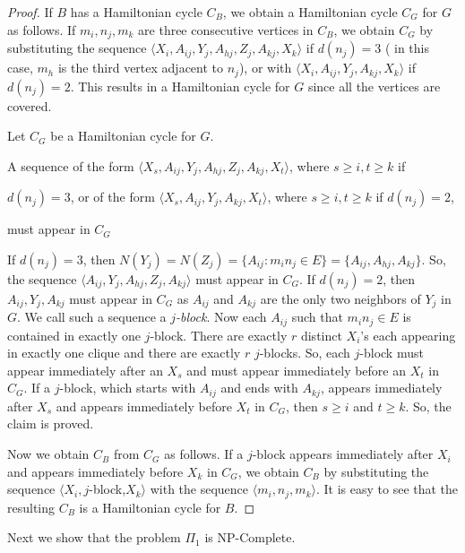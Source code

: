 \documentclass[a4paper,12pt]{article}
\theoremstyle{plain}
\theoremstyle{definition}
\theoremstyle{remark}
\begin{document}
\begin{proof}

If $B$ has a Hamiltonian cycle $C_B$, we obtain a Hamiltonian cycle
$C_G$ for $G$ as follows. If $m_i, n_j, m_k$ are three consecutive
vertices in $C_B$, we obtain $C_G$ by substituting the sequence
$\langle X_i, A_{ij}, Y_j, A_{hj}, Z_j, A_{kj}, X_k\rangle$ if
$d(n_j)=3$ ( in this case, $m_h$ is the third vertex adjacent to
$n_j$), or with $\langle X_i, A_{ij}, Y_j, A_{kj}, X_k\rangle$ if
$d(n_j)=2$. This results in a Hamiltonian cycle for $G$ since all
the vertices are covered.


Let $C_G$ be a Hamiltonian cycle for $G$.

 A sequence of the form $\langle X_s, A_{ij},
Y_j, A_{hj}, Z_j, A_{kj}, X_t\rangle$, where $s\geq i, t\geq k$ if

\hspace{1cm}$d(n_j)=3$, or of the form $\langle X_s, A_{ij}, Y_j,
A_{kj}, X_t\rangle$, where $s\geq i, t\geq k$ if $d(n_j)=2$,

\hspace{1cm}must appear in $C_G$


 If $d(n_j)=3$, then
$N(Y_j)=N(Z_j)=\{A_{ij}: m_in_j\in E\}=\{A_{ij},A_{hj},A_{kj}\}$.
So, the sequence $\langle A_{ij}, Y_j, A_{hj}, Z_j, A_{kj}\rangle$
must appear in $C_G$. If $d(n_j)=2$, then $A_{ij}, Y_j, A_{kj}$ must
appear in $C_G$ as $A_{ij}$ and $A_{kj}$ are the only two neighbors
of $Y_j$ in $G$. We call such a sequence  a {\it $j$-block}. Now
each $A_{ij}$ such that $m_in_j\in E$ is contained in exactly one
$j$-block. There are exactly $r$ distinct $X_i$'s each appearing in
exactly one clique and there are exactly $r$ $j$-blocks. So, each
$j$-block must appear immediately after an $X_s$ and must appear
immediately before an $X_t$ in $C_G$. If a $j$-block, which starts
with $A_{ij}$ and ends with $A_{kj}$,  appears immediately after
$X_s$ and appears immediately before $X_t$ in $C_G$, then $s\geq i$
and $t\geq k$. So, the claim is proved.

Now we obtain $C_B$ from $C_G$ as follows. If a $j$-block appears
immediately after $X_i$ and appears immediately before $X_k$ in
$C_G$, we obtain $C_B$ by substituting the sequence $\langle X_i,
j$-block,$X_k\rangle$ with the sequence $\langle m_i, n_j,
m_k\rangle$. It is easy  to see that the resulting $C_B$ is a
Hamiltonian cycle for $B$.



\end{proof}
Next we show that the problem $\Pi_1$ is NP-Complete.
\end{document}
